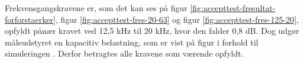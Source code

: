 Frekvensgangskravene er, som det kan ses på figur \ref{fig:accepttest-fresultat-forforstaerker}, figur \ref{fig:accepttest-fres-20-63} og figur \ref{fig:accepttest-fres-125-20}, opfyldt pånær kravet ved 12,5 kHz til 20 kHz, hvor den falder 0,8 dB. Dog udgør måleudstyret en kapacitiv belastning, som er vist på figur  i forhold til simuleringen  . Derfor betragtes alle kravene som værende opfyldt.